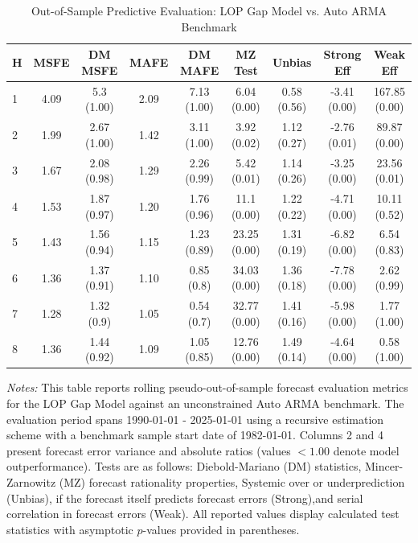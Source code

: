 \begin{table}[htbp]
\centering
\caption{Out-of-Sample Predictive Evaluation: LOP Gap Model vs. Auto ARMA Benchmark}
\label{tab:lop_gap_model_evaluation}
\footnotesize
\begin{tabular}{l cccccccc}
\hline\hline
\rule{0pt}{3ex}
\textbf{H} & \textbf{MSFE} & \textbf{DM MSFE} & \textbf{MAFE} & \textbf{DM MAFE} & \textbf{MZ Test} & \textbf{Unbias} & \textbf{Strong Eff} & \textbf{Weak Eff} \\[0.5ex]
\hline
\rule{0pt}{2.5ex}
1 & 4.09 & 5.3 (1.00) & 2.09 & 7.13 (1.00) & 6.04 (0.00) & 0.58 (0.56) & -3.41 (0.00) & 167.85 (0.00) \\
2 & 1.99 & 2.67 (1.00) & 1.42 & 3.11 (1.00) & 3.92 (0.02) & 1.12 (0.27) & -2.76 (0.01) & 89.87 (0.00) \\
3 & 1.67 & 2.08 (0.98) & 1.29 & 2.26 (0.99) & 5.42 (0.01) & 1.14 (0.26) & -3.25 (0.00) & 23.56 (0.01) \\
4 & 1.53 & 1.87 (0.97) & 1.20 & 1.76 (0.96) & 11.1 (0.00) & 1.22 (0.22) & -4.71 (0.00) & 10.11 (0.52) \\
5 & 1.43 & 1.56 (0.94) & 1.15 & 1.23 (0.89) & 23.25 (0.00) & 1.31 (0.19) & -6.82 (0.00) & 6.54 (0.83) \\
6 & 1.36 & 1.37 (0.91) & 1.10 & 0.85 (0.8) & 34.03 (0.00) & 1.36 (0.18) & -7.78 (0.00) & 2.62 (0.99) \\
7 & 1.28 & 1.32 (0.9) & 1.05 & 0.54 (0.7) & 32.77 (0.00) & 1.41 (0.16) & -5.98 (0.00) & 1.77 (1.00) \\
8 & 1.36 & 1.44 (0.92) & 1.09 & 1.05 (0.85) & 12.76 (0.00) & 1.49 (0.14) & -4.64 (0.00) & 0.58 (1.00) \\
\hline\hline
\end{tabular}%
\par\smallskip
\parbox{\textwidth}{\scriptsize \textit{Notes:} This table reports rolling pseudo-out-of-sample forecast evaluation metrics for the LOP Gap Model against an unconstrained Auto ARMA benchmark. The evaluation period spans 1990-01-01 - 2025-01-01 using a recursive estimation scheme with a benchmark sample start date of 1982-01-01. Columns 2 and 4 present forecast error variance and absolute ratios (values $< 1.00$ denote model outperformance). Tests are as follows: Diebold-Mariano (DM) statistics, Mincer-Zarnowitz (MZ) forecast rationality properties, Systemic over or underprediction (Unbias), if the forecast itself predicts forecast errors (Strong),and serial correlation in forecast errors (Weak). All reported values display calculated test statistics with asymptotic $p$-values provided in parentheses.}
\end{table}
